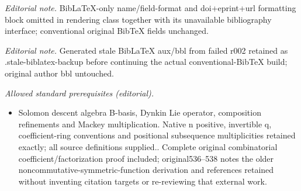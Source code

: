 \documentclass[revision]{FPSAC2025}
\begin{document}
\noindent\textit{Editorial note.} BibLaTeX-only name/field-format and doi+eprint+url formatting block omitted in rendering class together with its unavailable bibliography interface; conventional original BibTeX fields unchanged.\par\medskip
\noindent\textit{Editorial note.} Generated stale BibLaTeX aux/bbl from failed r002 retained as .stale-biblatex-backup before continuing the actual conventional-BibTeX build; original author bbl untouched.\par\medskip
\noindent\textit{Allowed standard prerequisites (editorial).}\begin{itemize}
\item Solomon descent algebra B-basis, Dynkin Lie operator, composition refinements and Mackey multiplication. Native n positive, invertible q, coefficient-ring conventions and positional subsequence multiplicities retained exactly; all source definitions supplied.. Complete original combinatorial coefficient/factorization proof included; original536--538 notes the older noncommutative-symmetric-function derivation and references retained without inventing citation targets or re-reviewing that external work.
\end{itemize}\medskip
\end{document}
